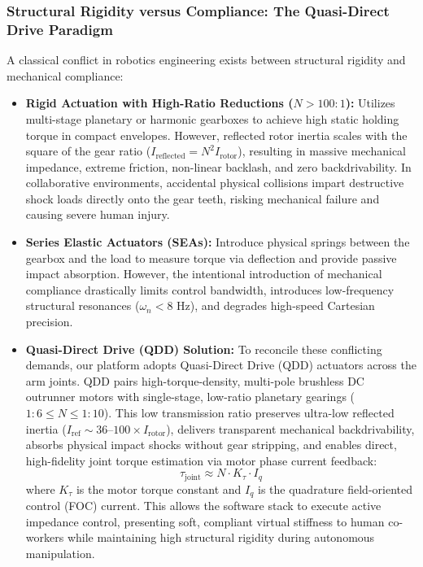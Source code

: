 \subsubsection{Structural Rigidity versus Compliance: The Quasi-Direct Drive Paradigm}
A classical conflict in robotics engineering exists between structural rigidity and mechanical compliance:
\begin{itemize}[leftmargin=1.5em]
  \item \textbf{Rigid Actuation with High-Ratio Reductions ($N > 100:1$):} Utilizes multi-stage planetary or harmonic gearboxes to achieve high static holding torque in compact envelopes. However, reflected rotor inertia scales with the square of the gear ratio ($I_{\text{reflected}} = N^2 I_{\text{rotor}}$), resulting in massive mechanical impedance, extreme friction, non-linear backlash, and zero backdrivability. In collaborative environments, accidental physical collisions impart destructive shock loads directly onto the gear teeth, risking mechanical failure and causing severe human injury.
  \item \textbf{Series Elastic Actuators (SEAs):} Introduce physical springs between the gearbox and the load to measure torque via deflection and provide passive impact absorption. However, the intentional introduction of mechanical compliance drastically limits control bandwidth, introduces low-frequency structural resonances ($\omega_n < 8\text{ Hz}$), and degrades high-speed Cartesian precision.
  \item \textbf{Quasi-Direct Drive (QDD) Solution:} To reconcile these conflicting demands, our platform adopts Quasi-Direct Drive (QDD) actuators across the arm joints. QDD pairs high-torque-density, multi-pole brushless DC outrunner motors with single-stage, low-ratio planetary gearings ($1:6 \le N \le 1:10$). This low transmission ratio preserves ultra-low reflected inertia ($I_{\text{ref}} \sim 36\text{--}100 \times I_{\text{rotor}}$), delivers transparent mechanical backdrivability, absorbs physical impact shocks without gear stripping, and enables direct, high-fidelity joint torque estimation via motor phase current feedback:
  \begin{equation}
  \tau_{\text{joint}} \approx N \cdot K_\tau \cdot I_q
  \label{eq:torque_current}
  \end{equation}
  where $K_\tau$ is the motor torque constant and $I_q$ is the quadrature field-oriented control (FOC) current. This allows the software stack to execute active impedance control, presenting soft, compliant virtual stiffness to human co-workers while maintaining high structural rigidity during autonomous manipulation.
\end{itemize}


